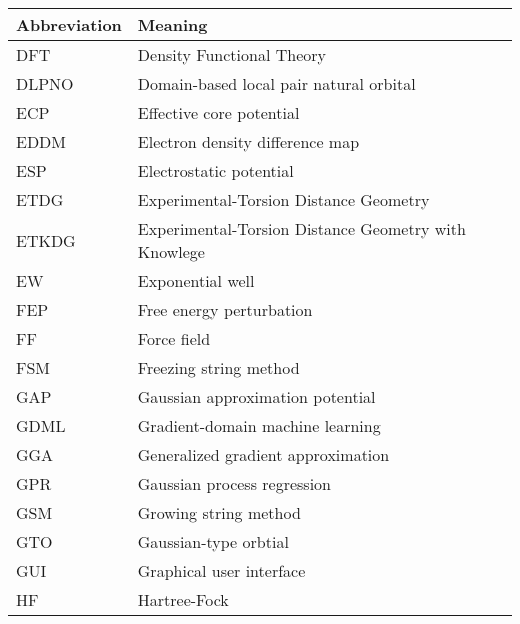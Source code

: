 \documentclass[../main.tex]{subfiles}
\begin{document}
\begin{table}[h!]
\def\arraystretch{2.0}
\begin{tabularx}{\textwidth}{YY}
Abbreviation & Meaning \\
\hline
DFT	&	Density Functional Theory	\\
DLPNO	&	Domain-based local pair natural orbital	\\
ECP	&	Effective core potential	\\
EDDM	&	Electron density difference map	\\
ESP	&	Electrostatic potential	\\
ETDG	&	Experimental-Torsion Distance Geometry	\\
ETKDG	&	Experimental-Torsion Distance Geometry with Knowlege	\\
EW	&	Exponential well	\\
FEP	&	Free energy perturbation	\\
FF	&	Force field	\\
FSM	&	Freezing string method	\\
GAP	&	Gaussian approximation potential	\\
GDML	&	Gradient-domain machine learning	\\
GGA	&	Generalized gradient approximation	\\
GPR	&	Gaussian process regression	\\
GSM	&	Growing string method	\\
GTO	&	Gaussian-type orbtial	\\
GUI	&	Graphical user interface	\\
HF	&	Hartree-Fock	\\
\end{tabularx}
\end{table}
\newpage
\end{document}
